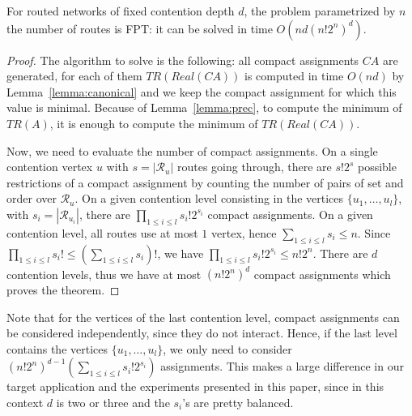\documentclass[english]{article}
\begin{document}

\begin{theorem}\label{theorem:FPT}
For routed networks of fixed contention depth $d$, the problem \spall parametrized by $n$ the number of routes is FPT: it can be solved in time $O(nd(n!2^{n})^{d})$.
\end{theorem}
\begin{proof}
The algorithm to solve \spall is the following: all compact assignments $CA$ are generated, for each of them $TR(Real(CA))$ is computed in time
$O(nd)$ by Lemma~\ref{lemma:canonical} and we keep the compact assignment for which this value is minimal.  Because of Lemma~\ref{lemma:prec}, to compute the minimum of $TR(A)$, it is enough 
to compute the minimum of $TR(Real(CA))$.

 Now, we need to evaluate the number of compact assignments. 
On a single contention vertex $u$ with $s = |\mathcal{R}_u|$ routes going through, there are $s!2^s$ possible restrictions of a compact assignment by counting the number of pairs of set and order over $\mathcal{R}_u$.
On a given contention level consisting in the vertices $\{u_1,\dots,u_l\}$, with $s_i = |\mathcal{R}_{u_{i}}|$, there are 
$\prod_{1 \leq i\leq l} s_i!2^{s_i}$ compact assignments. On a given contention level, all routes use at most $1$ vertex, hence $\sum_{1 \leq i\leq l} s_i \leq n$. Since $\prod_{1 \leq i\leq l} s_i! \leq (\sum_{1 \leq i\leq l} s_i)!$, we have $\prod_{1 \leq i\leq l} s_i!2^{s_i} \leq n!2^n$. There are $d$ contention levels, thus we have at most $ (n!2^{n})^{d}$ compact assignments which proves the theorem.
\end{proof}

Note that for the vertices of the last contention level, compact assignments can be considered independently, since
they do not interact. Hence, if the last level contains the vertices $\{u_1,\dots,u_l\}$, we only need to consider $(n!2^{n})^{d-1}(\sum_{1 \leq i\leq l} s_{i}!2^{s_i})$ assignments. This makes a large difference in our target application and the experiments presented in this paper, since in this context $d$ is two or three and the $s_i$'s are pretty balanced.
\end{document}
